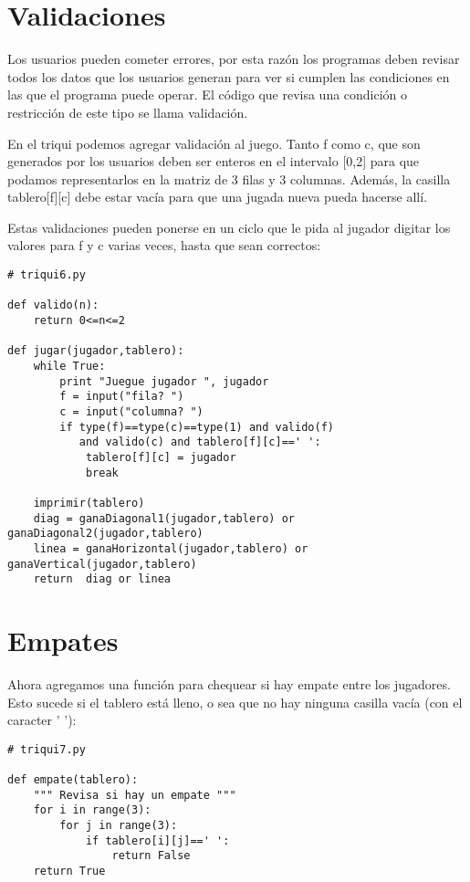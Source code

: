 \section{Validaciones}

Los usuarios pueden cometer errores, por esta razón los programas deben revisar
todos los datos que los usuarios generan para ver si cumplen las condiciones
en las que el programa puede operar. El código que revisa una condición 
o restricción de este tipo se llama validación.

En el triqui podemos agregar validación al juego. Tanto f como  c, que son 
generados por los usuarios deben ser enteros en el intervalo [0,2] para 
que podamos representarlos en la matriz de 3 filas y 3 columnas. Además,
la casilla tablero[f][c] debe estar vacía para que
una jugada nueva pueda hacerse allí.  

Estas validaciones pueden ponerse en un ciclo que le pida al jugador
digitar los valores para f y c varias veces, hasta que sean correctos:

\beforeverb
\begin{verbatim}
# triqui6.py

def valido(n):
    return 0<=n<=2
    
def jugar(jugador,tablero):
    while True:     
        print "Juegue jugador ", jugador
        f = input("fila? ")
        c = input("columna? ")
        if type(f)==type(c)==type(1) and valido(f) 
           and valido(c) and tablero[f][c]==' ':
            tablero[f][c] = jugador
            break      

    imprimir(tablero)
    diag = ganaDiagonal1(jugador,tablero) or ganaDiagonal2(jugador,tablero)
    linea = ganaHorizontal(jugador,tablero) or ganaVertical(jugador,tablero)
    return  diag or linea

\end{verbatim}
\afterverb

\section{Empates}

Ahora agregamos una función para chequear si hay empate entre los jugadores.
Esto sucede si el tablero está lleno, o sea que no hay ninguna casilla vacía 
(con el caracter ' '):

\beforeverb
\begin{verbatim}
# triqui7.py

def empate(tablero):
    """ Revisa si hay un empate """
    for i in range(3):
        for j in range(3):
            if tablero[i][j]==' ':
                return False
    return True

\end{verbatim}
\afterverb

